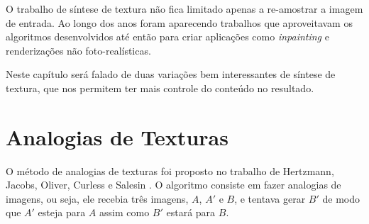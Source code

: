 O trabalho de síntese de textura
não fica limitado apenas a re-amostrar
a imagem de entrada. Ao longo
dos anos foram aparecendo trabalhos
que aproveitavam os algoritmos
desenvolvidos até então para
criar aplicações como \textit{inpainting}
e renderizações não foto-realísticas.



Neste capítulo será falado de duas
variações bem interessantes de síntese
de textura, que nos permitem ter mais
controle do conteúdo no resultado.


\section{Analogias de Texturas}

O método de analogias de texturas
foi proposto no trabalho de 
Hertzmann, Jacobs, Oliver, Curless
e Salesin \cite{Hertzmann2001}.
O algoritmo consiste em fazer analogias
de imagens, ou seja, ele
recebia três imagens, $A$, $A'$ e $B$,
e tentava gerar $B'$ de modo que
$A'$ esteja para $A$ assim como
$B'$ estará para $B$.


